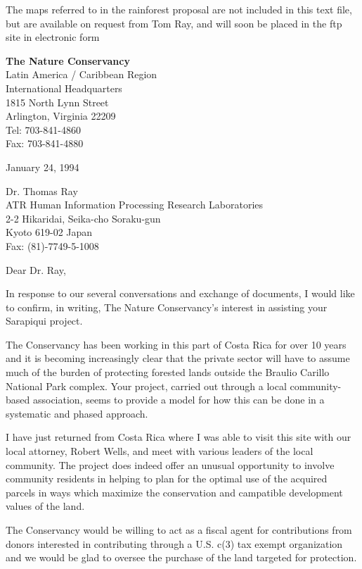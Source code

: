 \newpage

The maps referred to in the rainforest proposal are not included in
this text file, but are available on request from Tom Ray, and will
soon be placed in the ftp site in electronic form

\newpage

\begin{center}
{\large {\bf The Nature Conservancy}}\\
Latin America / Caribbean Region\\
International Headquarters\\
1815 North Lynn Street\\
Arlington, Virginia 22209\\
Tel: 703-841-4860\\
Fax: 703-841-4880\\
\end{center}

\LP
January 24, 1994

Dr. Thomas Ray\\
ATR Human Information Processing Research Laboratories\\
2-2 Hikaridai, Seika-cho Soraku-gun\\
Kyoto 619-02 Japan\\
Fax: (81)-7749-5-1008

Dear Dr. Ray,

In response to our several conversations and exchange of documents, I
would like to confirm, in writing, The Nature Conservancy's interest
in assisting your Sarapiqui project.

The Conservancy has been working in this part of Costa Rica for over
10 years and it is becoming increasingly clear that the private sector
will have to assume much of the burden of protecting forested lands
outside the Braulio Carillo National Park complex.  Your project,
carried out through a local community-based association, seems to
provide a model for how this can be done in a systematic and phased
approach.

I have just returned from Costa Rica where I was able to visit this
site with our local attorney, Robert Wells, and meet with various
leaders of the local community.  The project does indeed offer an
unusual opportunity to involve community residents in helping to plan
for the optimal use of the acquired parcels in ways which maximize the
conservation and campatible development values of the land.

The Conservancy would be willing to act as a fiscal agent for contributions
from donors interested in contributing through a U.S. c(3) tax exempt
organization and we would be glad to oversee the purchase of the land
targeted for protection.

